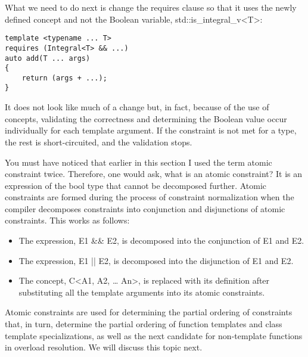 What we need to do next is change the requires clause so that it uses the newly defined concept and not the Boolean variable, std::is\_integral\_v<T>:

\begin{lstlisting}[style=styleCXX]
template <typename ... T>
requires (Integral<T> && ...)
auto add(T ... args)
{
	return (args + ...);
}
\end{lstlisting}

It does not look like much of a change but, in fact, because of the use of concepts, validating the correctness and determining the Boolean value occur individually for each template argument. If the constraint is not met for a type, the rest is short-circuited, and the validation stops.

You must have noticed that earlier in this section I used the term atomic constraint twice. Therefore, one would ask, what is an atomic constraint? It is an expression of the bool type that cannot be decomposed further. Atomic constraints are formed during the process of constraint normalization when the compiler decomposes constraints into conjunction and disjunctions of atomic constraints. This works as follows:

\begin{itemize}
\item
The expression, E1 \&\& E2, is decomposed into the conjunction of E1 and E2.

\item
The expression, E1 || E2, is decomposed into the disjunction of E1 and E2.

\item
The concept, C<A1, A2, … An>, is replaced with its definition after substituting all the template arguments into its atomic constraints.
\end{itemize}

Atomic constraints are used for determining the partial ordering of constraints that, in turn, determine the partial ordering of function templates and class template specializations, as well as the next candidate for non-template functions in overload resolution. We will discuss this topic next.











